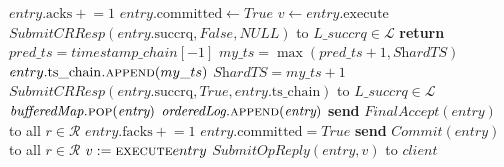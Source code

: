 \begin{algorithm}[!tb]
\begin{algorithmic}[1]
      \EndProcedure
      \State $entry.\mathrm{acks}\mathrel{+}=1$
        \State $entry.\mathrm{committed} \gets \textit{True}$
        \EndIf
        \State $v \gets entry.\mathrm{execute}$
          \State $\textit{SubmitCRResp}(entry.\mathrm{succrq}, False, NULL)$ to $L\_{succrq} \in \mathcal{L}$
          \State \textbf{return}
          \EndIf
        \label{ts_assignment_pt1}
        \State $pred\_ts = timestamp\_chain[-1]$
        \State $\textit{my\_ts} = \max(\textit{pred\_ts}+1, \textit{ShardTS})$
        \State $entry.\mathrm{ts\_chain}\textsc{.append}(my\_ts)$
        \label{ts_assignment_pt2}
        \State $\textit{ShardTS} = \textit{my\_ts}+1$
          \State $\textit{SubmitCRResp}(entry.\mathrm{succrq}, True, entry.\mathrm{ts\_chain})$ to $L\_{succrq} \in \mathcal{L}$
          \EndIf
        \State $\textit{bufferedMap}\textsc{.pop}(\textit{entry})$
        \State $\textit{orderedLog}\textsc{.append}(\textit{entry})$
        \State \textbf{send} $\textit{FinalAccept}(\textit{entry})$ to all $r \in \mathcal{R}$
        \EndIf
      \EndProcedure
      \State $entry.\mathrm{facks}\mathrel{+}=1$
        \State $entry.\mathrm{committed} = True$
        \State \textbf{send} $\textit{Commit}(\textit{entry})$ to all $r \in \mathcal{R}$
        \State $v := \textsc{execute}{entry}$
        \State $\textit{SubmitOpReply}(\textit{entry}, v)$ to $\textit{client}$
        \EndIf
      \EndProcedure
  \end{algorithmic}
\end{algorithm}



